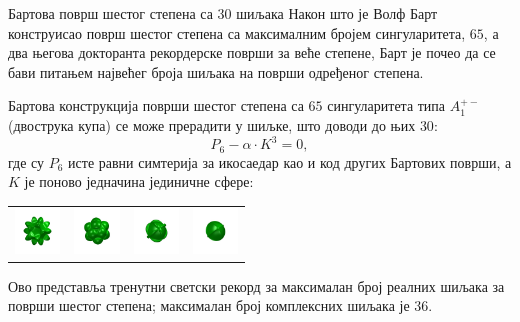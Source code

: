\begin{surferPage}{Бартова површ шестог степена са 30 шиљака}
    Након што је Волф Барт конструисао површ шестог степена са максималним бројем 
	сингуларитета, $65$, а два његова докторанта рекордерске површи за веће степене, 
    Барт је почео да се бави питањем највећег броја шиљака на површи одређеног степена.

   Бартова конструкција површи шестог степена са $65$ сингуларитета типа 
    $A_1^{+-}$ (двострука купа) се може прерадити у шиљке, што доводи до њих  $30$: 
    \[P_6 - \alpha \cdot K^3=0,\]
  где су  $P_6$ исте равни симтерија за икосаедар
    као и код других Бартових површи, а $K$ је
    поново једначина јединичне сфере:
    \vspace*{-0.4em}
    \begin{center}
      \begin{tabular}{c@{\ }c@{\ }c@{\ }c}
        \includegraphics[height=1.2cm]{./../../common/images/barthsextic_30A2}
        &
        \includegraphics[height=1.2cm]{./../../common/images/barthsextic_30A2_3}
        &
        \includegraphics[height=1.2cm]{./../../common/images/barthsextic_30A2_5}
        &
        \includegraphics[height=1.2cm]{./../../common/images/barthsextic_30A2_6}
      \end{tabular}
    \end{center}    
    \vspace*{-0.3em}
     Ово представља тренутни светски рекорд за максималан број реалних шиљака за површи шестог степена;
	 максималан број комплексних шиљака је  $36$.
\end{surferPage}
